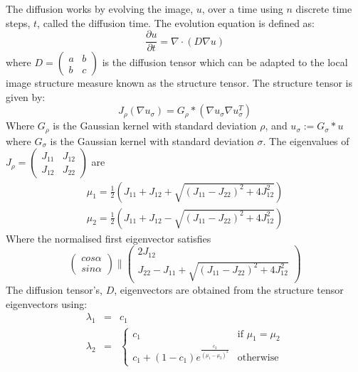 The diffusion works by evolving the image, $u$, over a time using $n$ discrete time steps, $t$, called the diffusion time. The evolution equation is defined as:
\begin{equation}
\frac{\partial u}{\partial t} = \nabla \cdot (D\nabla u)
\end{equation}
where $D = \begin{pmatrix}
a & b \\
b & c
\end{pmatrix}$ is the diffusion tensor which can be adapted to the local image structure measure known as the structure tensor. The structure tensor is given by:
\begin{equation}
J_{\rho}(\nabla u_{\sigma}) = G_{\rho} \ast (\nabla u_{\sigma} \nabla u_{\sigma}^T)
\end{equation}
Where $G_{\rho}$ is the Gaussian kernel with standard deviation $\rho$, and $u_{\sigma} := G_{\sigma} \ast u$ where $G_{\sigma}$ is the Gaussian kernel with standard deviation $\sigma$.
The eigenvalues of $J_{\rho}=\begin{pmatrix}
J_{11} & J_{12} \\
J_{12} & J_{22}
\end{pmatrix}$ are
\begin{eqnarray}
\mu_{1} = \frac{1}{2}\left( J_{11} + J_{12} + \sqrt{(J_{11}-J_{22})^2+4J_{12}^2} \right) \\
\mu_{2} = \frac{1}{2}\left( J_{11} + J_{12} - \sqrt{(J_{11}-J_{22})^2+4J_{12}^2} \right)
\end{eqnarray}
Where the normalised first eigenvector satisfies
\begin{equation}
\begin{pmatrix}
cos \alpha \\
sin \alpha
\end{pmatrix} \parallel
\begin{pmatrix}
2J_{12} \\
J_{22}-J_{11}+\sqrt{(J_{11}-J_{22})^2 + 4J_{12}^2}
\end{pmatrix}
\end{equation}
The diffusion tensor's, $D$, eigenvectors are obtained from the structure tensor eigenvectors using:
\begin{eqnarray}
\lambda_1 &=& c_1 \\
\lambda_2 &=& \left\lbrace \begin{matrix}
c_1 & \text{if } \mu_1=\mu_2 \\
c_1+(1-c_1)e^{\frac{c_2}{(\mu_1-\mu_2)^2}}& \text{otherwise}
\end{matrix}
\right.
\end{eqnarray}
